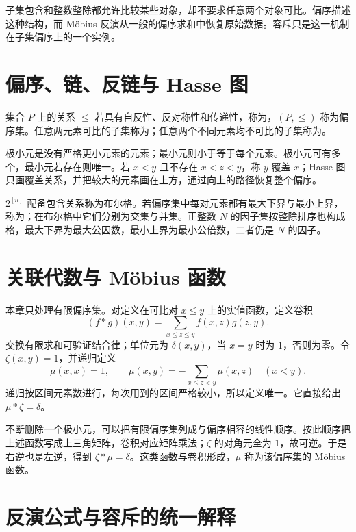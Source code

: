 \documentclass[UTF8,12pt,a4paper,fontset=fandol]{ctexbook}
\begin{document}
子集包含和整数整除都允许比较某些对象，却不要求任意两个对象可比。偏序描述这种结构，而 M\"obius 反演从一般的偏序求和中恢复原始数据。容斥只是这一机制在子集偏序上的一个实例。

\section{偏序、链、反链与 Hasse 图}

\begin{definition}
集合 $P$ 上的关系 $\le$ 若具有自反性、反对称性和传递性，称为，$(P,\le)$ 称为偏序集。任意两元素可比的子集称为；任意两个不同元素均不可比的子集称为。
\end{definition}

极小元是没有严格更小元素的元素；最小元则小于等于每个元素。极小元可有多个，最小元若存在则唯一。若 $x<y$ 且不存在 $x<z<y$，称 $y$ 覆盖 $x$；Hasse 图只画覆盖关系，并把较大的元素画在上方，通过向上的路径恢复整个偏序。

$2^{[n]}$ 配备包含关系称为布尔格。若偏序集中每对元素都有最大下界与最小上界，称为；在布尔格中它们分别为交集与并集。正整数 $N$ 的因子集按整除排序也构成格，最大下界为最大公因数，最小上界为最小公倍数，二者仍是 $N$ 的因子。

\section{关联代数与 M\"obius 函数}

本章只处理有限偏序集。对定义在可比对 $x\le y$ 上的实值函数，定义卷积
\[
 (f*g)(x,y)=\sum_{x\le z\le y}f(x,z)g(z,y).
\]
交换有限求和可验证结合律；单位元为 $\delta(x,y)$，当 $x=y$ 时为 $1$，否则为零。令 $\zeta(x,y)=1$，并递归定义
\[
 \mu(x,x)=1,\qquad
 \mu(x,y)=-\sum_{x\le z<y}\mu(x,z)\quad(x<y).
\]
递归按区间元素数进行，每次用到的区间严格较小，所以定义唯一。它直接给出 $\mu*\zeta=\delta$。

不断删除一个极小元，可以把有限偏序集列成与偏序相容的线性顺序。按此顺序把上述函数写成上三角矩阵，卷积对应矩阵乘法；$\zeta$ 的对角元全为 $1$，故可逆。于是右逆也是左逆，得到 $\zeta*\mu=\delta$。这类函数与卷积形成，$\mu$ 称为该偏序集的 M\"obius 函数。

\section{反演公式与容斥的统一解释}
\end{document}
